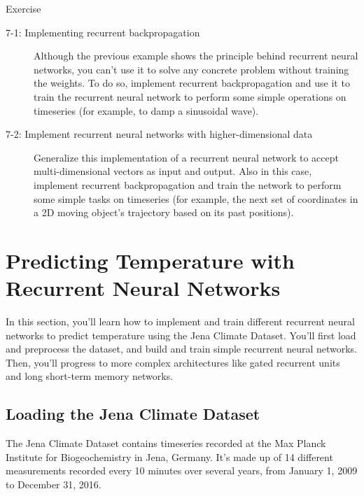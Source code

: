 \begin{nspbox}{Exercise}
\begin{description}
	\item[7-1: Implementing recurrent backpropagation]
    Although the previous example shows the principle behind recurrent neural networks, you can't use it to solve any concrete problem without training the weights.
    To do so, implement recurrent backpropagation and use it to train the recurrent neural network to perform some simple operations on timeseries (for example, to damp a sinusoidal wave).
    
	\item[7-2: Implement recurrent neural networks with higher-dimensional data]
    Generalize this implementation of a recurrent neural network to accept multi-dimensional vectors as input and output. Also in this case, implement recurrent backpropagation and train the network to perform some simple tasks on timeseries (for example, the next set of coordinates in a 2D moving object's trajectory based on its past positions).
\end{description}
\end{nspbox}

\section{Predicting Temperature with Recurrent Neural Networks}

In this section, you'll learn how to implement and train different recurrent neural networks to predict temperature using the Jena Climate Dataset. You'll first load and preprocess the dataset, and build and train simple recurrent neural networks. Then, you'll progress to more complex architectures like gated recurrent units and long short-term memory networks.

\subsection{Loading the Jena Climate Dataset}

The Jena Climate Dataset contains timeseries recorded at the Max Planck Institute for Biogeochemistry in Jena, Germany. It's made up of 14 different measurements recorded every 10 minutes over several years, from January 1, 2009 to December 31, 2016.

